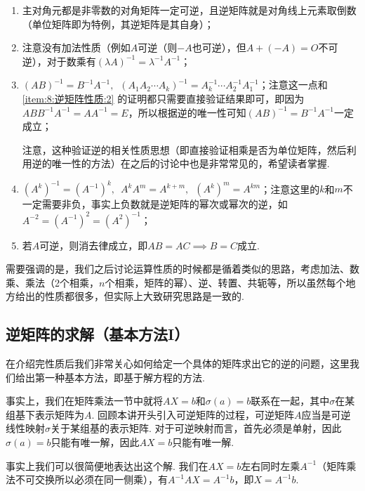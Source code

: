 \begin{enumerate}[label=(\arabic*)]
    \item 主对角元都是非零数的对角矩阵一定可逆，且逆矩阵就是对角线上元素取倒数（单位矩阵即为特例，其逆矩阵是其自身）；

    \item \label{item:8:逆矩阵性质:2}
          注意没有加法性质（例如$A$可逆（则$-A$也可逆），但$A+(-A)=O$不可逆），对于数乘有$(\lambda A)^{-1}=\lambda^{-1}A^{-1}$；

    \item \label{item:8:逆矩阵性质:3}
          $(AB)^{-1}=B^{-1}A^{-1},\enspace (A_1A_2\cdots A_k)^{-1}=A_k^{-1}\cdots A_2^{-1}A_1^{-1}$；注意这一点和 \ref*{item:8:逆矩阵性质:2} 的证明都只需要直接验证结果即可，即因为$ABB^{-1}A^{-1}=AA^{-1}=E$，所以根据逆的唯一性可知$(AB)^{-1}=B^{-1}A^{-1}$一定成立；

          注意，这种验证逆的相关性质思想（即直接验证相乘是否为单位矩阵，然后利用逆的唯一性的方法）在之后的讨论中也是非常常见的，希望读者掌握.

    \item $(A^k)^{-1}=(A^{-1})^k,\enspace A^kA^m=A^{k+m},\enspace (A^k)^m=A^{km}$；注意这里的$k$和$m$不一定需要非负，事实上负数就是逆矩阵的幂次或幂次的逆，如$A^{-2}=(A^{-1})^2=(A^2)^{-1}$；

    \item 若$A$可逆，则消去律成立，即$AB=AC \implies B=C$成立.
\end{enumerate}

需要强调的是，我们之后讨论运算性质的时候都是循着类似的思路，考虑加法、数乘、乘法（2个相乘，$n$个相乘，矩阵的幂）、逆、转置、共轭等，所以虽然每个地方给出的性质都很多，但实际上大致研究思路是一致的.

\subsection{逆矩阵的求解（基本方法I）}

在介绍完性质后我们非常关心如何给定一个具体的矩阵求出它的逆的问题，这里我们给出第一种基本方法，即基于解方程的方法.

事实上，我们在矩阵乘法一节中就将$AX=b$和$\sigma(a)=b$联系在一起，其中$\sigma$在某组基下表示矩阵为$A$. 回顾本讲开头引入可逆矩阵的过程，可逆矩阵$A$应当是可逆线性映射$\sigma$关于某组基的表示矩阵. 对于可逆映射而言，首先必须是单射，因此$\sigma(a)=b$只能有唯一解，因此$AX=b$只能有唯一解.

事实上我们可以很简便地表达出这个解. 我们在$AX=b$左右同时左乘$A^{-1}$（矩阵乘法不可交换所以必须在同一侧乘），有$A^{-1}AX=A^{-1}b$，即$X=A^{-1}b$.

